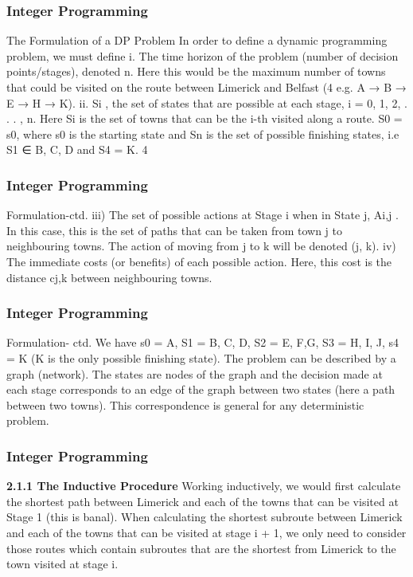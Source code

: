 \begin{frame} 
\frametitle{Integer Programming}     
The Formulation of a DP Problem
In order to define a dynamic programming problem, we must define
i. The time horizon of the problem (number of decision
points/stages), denoted n.
Here this would be the maximum number of towns
that could be visited on the route between Limerick
and Belfast (4 e.g. A → B → E → H → K).
ii. Si
, the set of states that are possible at each stage,
i = 0, 1, 2, . . . , n.
Here Si
is the set of towns that can be the i-th
visited along a route. S0 = {s0}, where s0 is the
starting state and Sn is the set of possible finishing
states, i.e S1 ∈ {B, C, D} and S4 = K.
4 \end{frame}  \begin{frame} \frametitle{Integer Programming}     
Formulation-ctd.
iii) The set of possible actions at Stage i when in State
j, Ai,j
.
In this case, this is the set of paths that can be taken
from town j to neighbouring towns. The action of
moving from j to k will be denoted (j, k).
iv) The immediate costs (or benefits) of each possible
action.
Here, this cost is the distance cj,k between
neighbouring towns.
\end{frame}  
\begin{frame} 
\frametitle{Integer Programming}     
Formulation- ctd.
We have s0 = A, S1 = {B, C, D}, S2 = {E, F,G}, S3 = {H, I, J},
s4 = K (K is the only possible finishing state).
The problem can be described by a graph (network).
The states are nodes of the graph and the decision made at each
stage corresponds to an edge of the graph between two states
(here a path between two towns).
This correspondence is general for any deterministic problem.
\end{frame}  
\begin{frame} 
\frametitle{Integer Programming}     
\noindent \textbf{2.1.1 The Inductive Procedure}
Working inductively, we would first calculate the shortest path
between Limerick and each of the towns that can be visited at
Stage 1 (this is banal).
When calculating the shortest subroute between Limerick and each
of the towns that can be visited at stage i + 1, we only need to
consider those routes which contain subroutes that are the shortest
from Limerick to the town visited at stage i.
\end{frame} 
